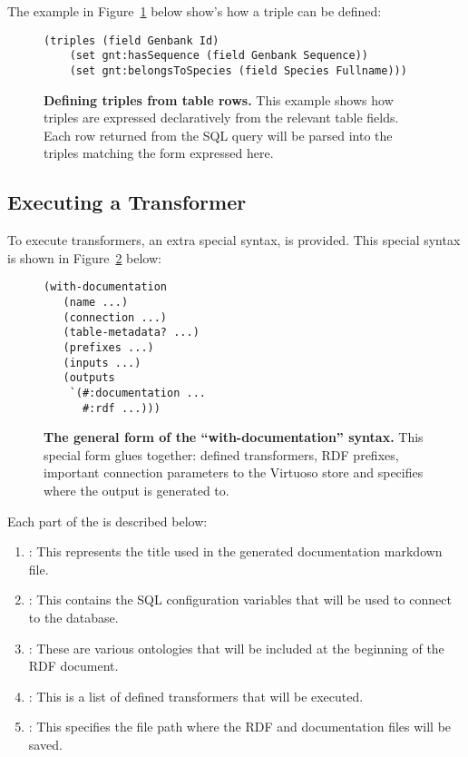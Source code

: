 The example in Figure~\ref{code:triples-example} below show's how a triple can be defined:

\begin{figure}[H]
\centering
\begin{verbatim}
(triples (field Genbank Id)
    (set gnt:hasSequence (field Genbank Sequence))
    (set gnt:belongsToSpecies (field Species Fullname)))
\end{verbatim}
\caption[\textit{``triples''} special form]{\textbf{Defining triples from table rows.}  This example shows how triples are expressed declaratively from the relevant table fields.  Each row returned from the SQL query will be parsed into the triples matching the form expressed here.}\label{code:triples-example}
\end{figure}

\subsection{Executing a Transformer}

To execute transformers, an extra special syntax,  is provided.  This special syntax is shown in Figure~\ref{code:with-documentation-syntax} below:

\begin{figure}[H]
\centering
\begin{verbatim}
(with-documentation
   (name ...)
   (connection ...)
   (table-metadata? ...)
   (prefixes ...)
   (inputs ...)
   (outputs
    `(#:documentation ...
      #:rdf ...)))
\end{verbatim}
\caption[\textit{``with-documentation''} special form]{\textbf{The general form of the ``with-documentation'' syntax.}  This special form glues together: defined transformers, RDF prefixes, important connection parameters to the Virtuoso store and specifies where the output is generated to.}\label{code:with-documentation-syntax}
\end{figure}

Each part of the  is described below:

\begin{enumerate}
\item {}: This represents the title used in the generated documentation markdown file.
\item {}: This contains the SQL configuration variables that will be used to connect to the database.
\item {}: These are various ontologies that will be included at the beginning of the RDF document.
\item {}: This is a list of defined transformers that will be executed.
\item {}: This specifies the file path where the RDF and documentation files will be saved.
\end{enumerate}

